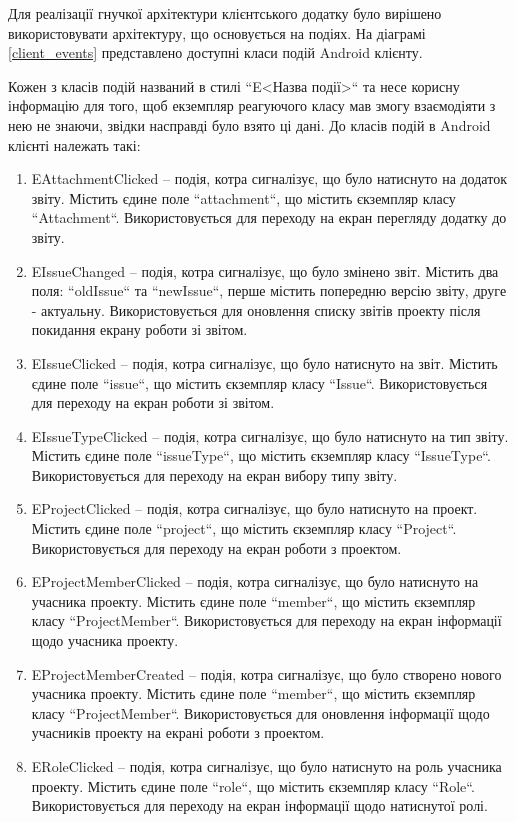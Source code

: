 \documentclass[../main.tex]{subfiles}
\begin{document}
		Для реалізації гнучкої архітектури клієнтського додатку було вирішено використовувати архітектуру, що основується на подіях. На діаграмі \ref{client_events} представлено доступні класи подій Android клієнту.
		
		Кожен з класів подій названий в стилі ``E<Назва події>`` та несе корисну інформацію для того, щоб екземпляр реагуючого класу мав змогу взаємодіяти з нею не знаючи, звідки насправді було взято ці дані. До класів подій в Android клієнті належать такі:
		\begin{enumerate}
			\item EAttachmentClicked -- подія, котра сигналізує, що було натиснуто на додаток звіту. Містить єдине поле ``attachment``, що містить єкземпляр класу ``Attachment``. Використовується для переходу на екран перегляду додатку до звіту.
			\item EIssueChanged -- подія, котра сигналізує, що було змінено звіт. Містить два поля: ``oldIssue`` та ``newIssue``, перше містить попередню версію звіту, друге - актуальну. Використовується для оновлення списку звітів проекту після покидання екрану роботи зі звітом.
			\item EIssueClicked -- подія, котра сигналізує, що було натиснуто на звіт. Містить єдине поле ``issue``, що містить єкземпляр класу ``Issue``. Використовується для переходу на екран роботи зі звітом.
			\item EIssueTypeClicked -- подія, котра сигналізує, що було натиснуто на тип звіту. Містить єдине поле ``issueType``, що містить єкземпляр класу ``IssueType``. Використовується для переходу на екран вибору типу звіту.
			\item EProjectClicked -- подія, котра сигналізує, що було натиснуто на проект. Містить єдине поле ``project``, що містить єкземпляр класу ``Project``. Використовується для переходу на екран роботи з проектом.
			\item EProjectMemberClicked -- подія, котра сигналізує, що було натиснуто на учасника проекту. Містить єдине поле ``member``, що містить єкземпляр класу ``ProjectMember``. Використовується для переходу на екран інформації щодо учасника проекту.
			\item EProjectMemberCreated -- подія, котра сигналізує, що було створено нового учасника проекту. Містить єдине поле ``member``, що містить єкземпляр класу ``ProjectMember``. Використовується для оновлення інформації щодо учасників проекту на екрані роботи з проектом.
			\item ERoleClicked -- подія, котра сигналізує, що було натиснуто на роль учасника проекту. Містить єдине поле ``role``, що містить єкземпляр класу ``Role``. Використовується для переходу на екран інформації щодо натиснутої ролі.

\end{enumerate}
\end{document}
